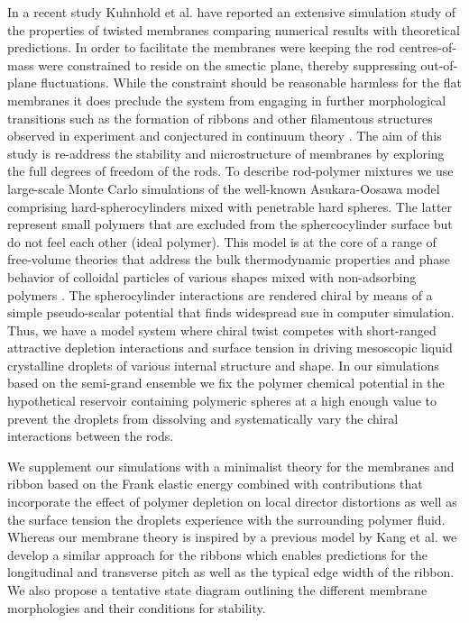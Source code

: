 In a recent study Kuhnhold et al. \cite{kuhnhold2022colloidal} have reported an extensive simulation study of the properties of twisted membranes comparing numerical results with theoretical predictions. In order to facilitate the membranes were keeping the rod centres-of-mass were constrained to reside on the smectic plane, thereby suppressing out-of-plane fluctuations. While the constraint should be reasonable harmless for the flat membranes it does preclude the system from engaging in further morphological transitions such as the formation of ribbons and other filamentous structures observed in experiment \cite{Gibaud2012} and conjectured in continuum theory \cite{kaplan2010theory,kang_sm2016}. The aim of this study is re-address the stability and microstructure of membranes by exploring the full degrees of freedom of the rods. To describe rod-polymer mixtures we use large-scale Monte Carlo simulations of the well-known Asukara-Oosawa model comprising hard-spherocylinders mixed with penetrable hard spheres. The latter represent small polymers that are excluded from the sphercocylinder surface but do not feel each other (ideal polymer). This model is at the core of a range of free-volume theories that address the bulk thermodynamic properties and phase behavior of colloidal particles of  various shapes mixed with non-adsorbing polymers \cite{LekkerkerkerTuinier2011}. The spherocylinder interactions are rendered chiral by means of a simple pseudo-scalar potential that finds widespread sue in computer simulation. Thus, we have a model system where chiral twist competes with short-ranged attractive depletion interactions and surface tension in driving mesoscopic liquid crystalline droplets of various internal structure and shape.  In our simulations based on the semi-grand ensemble we fix the polymer chemical potential in the hypothetical reservoir containing polymeric spheres at a high enough value to prevent the droplets from dissolving and systematically vary the chiral interactions between the rods.

We supplement our simulations with a minimalist theory for the membranes and ribbon based on the Frank elastic energy combined with contributions that incorporate the effect of polymer depletion on local director distortions as well as the surface tension the droplets experience with the surrounding polymer fluid. Whereas our membrane theory is inspired by a previous model by Kang et al. \cite{kang_sm2016} we develop a similar approach for the ribbons which enables predictions for the longitudinal and transverse pitch as well as the typical edge width of the ribbon. We also propose a tentative state diagram outlining the different membrane morphologies and their conditions for stability.

